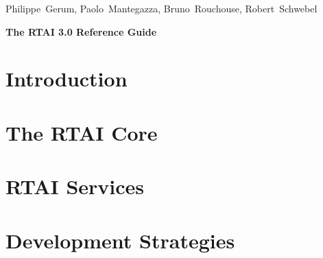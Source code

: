 \documentclass[10pt,a4paper,pointlessnumbers,bibtotocnumbered,headsepline]{scrbook}
\begin{document}

\newpage
\thispagestyle{empty}

\begin{center}
{
\Large \sf Philippe~Gerum, Paolo~Mantegazza, Bruno~Rouchouse, Robert~Schwebel 

\vspace{2 cm}

\Huge \sf \textbf{The RTAI 3.0 Reference Guide}
}
\end{center}

\vspace{\fill}

\newpage

\thispagestyle{headings}

{
\parskip0mm
\tableofcontents
}


\part{Introduction}




\part{The RTAI Core}
%
%

\part{RTAI Services}









\part{Development Strategies}

\end{document}
